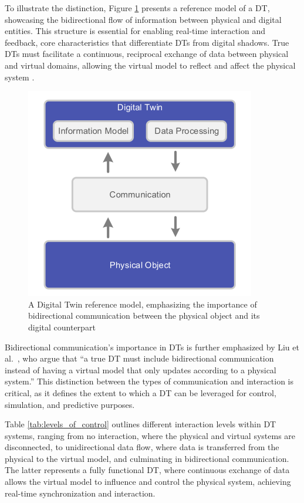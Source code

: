 To illustrate the distinction, Figure \ref{f:dt-structure} presents a reference model of a \ac{DT}, showcasing the bidirectional flow of information between physical and digital entities. This structure is essential for enabling real-time interaction and feedback, core characteristics that  differentiate \ac{DTs} from digital shadows. True \ac{DTs} must facilitate a continuous, reciprocal exchange of data between physical and virtual domains, allowing the virtual model to reflect and affect the physical system \cite{dt_model}.

\begin{figure}[!htpb]
    \centering
    \includegraphics[width=0.4\linewidth]{figs/dt_reference_model.png}
    \caption{A Digital Twin reference model, emphasizing the importance of bidirectional communication between the physical object and its digital counterpart~\cite{dt_model}}
    \label{f:dt-structure}
\end{figure}

Bidirectional communication's importance in \ac{DTs} is further emphasized by Liu et al.~\cite{liu2022state}, who argue that “a true DT must include bidirectional communication instead of having a virtual model that only updates according to a physical system.” This distinction between the types of communication and interaction is critical, as it defines the extent to which a \ac{DT} can be leveraged for control, simulation, and predictive purposes.

Table \ref{tab:levels_of_control} outlines different interaction levels within \ac{DT} systems, ranging from no interaction, where the physical and virtual systems are disconnected, to unidirectional data flow, where data is transferred from the physical to the virtual model, and culminating in bidirectional communication. The latter represents a fully functional \ac{DT}, where continuous exchange of data allows the virtual model to influence and control the physical system, achieving real-time synchronization and interaction.


